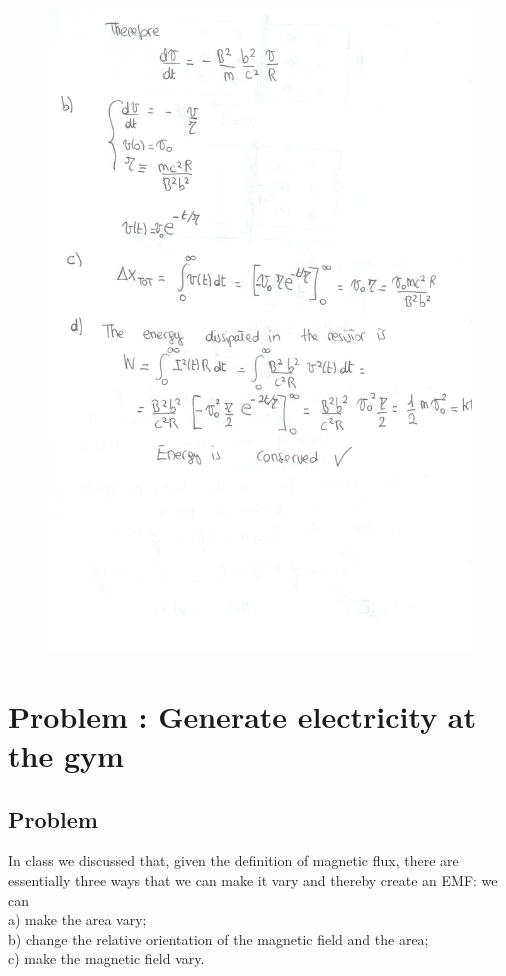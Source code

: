 \documentclass[solutions]{esg8022pset}
\begin{document}
    \begin{figure}[H]
    \centering
    \includegraphics[width = 25cm]{ps9_2b}
  \end{figure}
\section{Problem \thesection: Generate electricity at the gym}
\subsection{Problem}
In class we discussed that, given the definition of magnetic flux, there are essentially three ways that we can make it vary and thereby create an EMF: we can \\
\noindent a) make the area vary;\\
\noindent b) change the relative orientation of the magnetic field and the area; \\
\noindent c) make the magnetic field vary. \\
\end{document}
